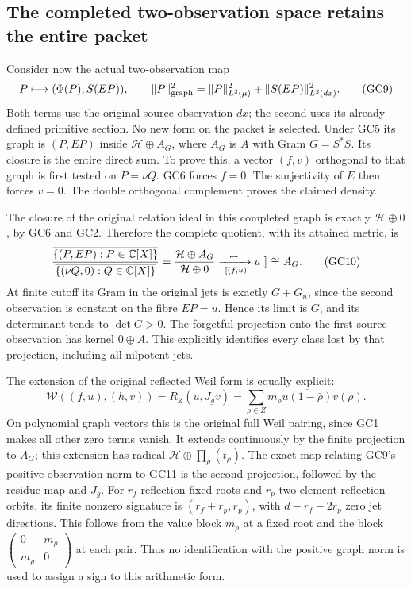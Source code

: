 \subsection{The completed two-observation space retains the entire packet}
Consider now the actual two-observation map
\[
 P\longmapsto(\Phi(P),S(EP)),\qquad
 \|P\|_{\rm graph}^2=\|P\|_{L^2(\mu)}^2+\|S(EP)\|_{L^2(dx)}^2.
 \tag{GC9}\label{gc:graph}
\]
Both terms use the original source observation $dx$; the second
uses its already defined primitive section. No new form on the
packet is selected. Under GC5 its graph is $(P,EP)$ inside
$\mathcal H\oplus A_G$, where $A_G$ is $A$ with Gram $G=S^*S$.
Its closure is the entire direct sum. To prove this, a vector
$(f,v)$ orthogonal to that graph is first tested on $P=\nu Q$.
GC6 forces $f=0$. The surjectivity of $E$ then forces $v=0$.
The double orthogonal complement proves the claimed density.

The closure of the original relation ideal in this completed
graph is exactly $\mathcal H\oplus0$, by GC6 and GC2. Therefore
the complete quotient, with its attained metric, is
\[
 \frac{\overline{\{(P,EP):P\in\mathbb C[X]\}}}
      {\overline{\{(\nu Q,0):Q\in\mathbb C[X]\}}}
       =\frac{\mathcal H\oplus A_G}{\mathcal H\oplus0}
       \xrightarrow[\ [(f,u)]\mapsto u\ ]{\ \cong\ }A_G.
 \tag{GC10}\label{gc:completed-quotient}
\]
At finite cutoff its Gram in the original jets is exactly
$G+G_n$, since the second observation is constant on the fibre
$EP=u$. Hence its limit is $G$, and its determinant tends to
$\det G>0$. The forgetful projection onto the first source
observation has kernel $0\oplus A$. This explicitly identifies
every class lost by that projection, including all nilpotent jets.

The extension of the original reflected Weil form is equally
explicit:
\[
 \mathcal W((f,u),(h,v))
   =R_Z(u,J_gv)
   =\sum_{\rho\in Z}m_\rho\overline{u(1-\bar\rho)}v(\rho).
 \tag{GC11}\label{gc:weil}
\]
On polynomial graph vectors this is the original full Weil
pairing, since GC1 makes all other zero terms vanish. It extends
continuously by the finite projection to $A_G$; this extension
has radical $\mathcal H\oplus\prod_\rho(t_\rho)$.
The exact map relating GC9's positive observation norm to GC11
is the second projection, followed by the residue map and
$J_g$. For $r_f$ reflection-fixed roots and $r_p$ two-element
reflection orbits, its finite nonzero signature is
$(r_f+r_p,r_p)$, with $d-r_f-2r_p$ zero jet directions.
This follows from the value block $m_\rho$ at a fixed root and
the block $\left(\begin{smallmatrix}0&m_\rho\\m_\rho&0\end{smallmatrix}\right)$
at each pair. Thus no identification with the positive graph
norm is used to assign a sign to this arithmetic form.


